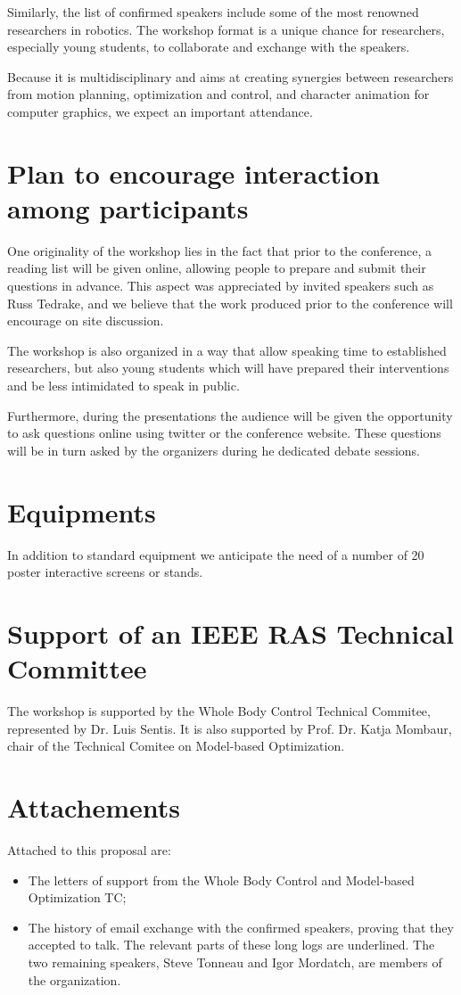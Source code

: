 \documentclass[conference]{IEEEtran}
\begin{document}
Similarly, the list of confirmed speakers include some of the most renowned researchers in robotics.
The workshop format is a unique chance for researchers, especially young students, to collaborate and exchange with the speakers.

Because it is multidisciplinary and aims at creating synergies between researchers from motion planning, optimization and control, and character animation for computer graphics, we expect an important attendance.

\section{Plan to encourage interaction among participants}
One originality of the workshop lies in the fact that prior to the conference, a reading list will be given online, allowing people to prepare and submit their questions in advance. This aspect was appreciated by invited speakers such as Russ Tedrake, and we believe that the work produced prior to the conference will encourage on site discussion.

The workshop is also organized in a way that allow speaking time to established researchers, but also young students which will have prepared their interventions and be less intimidated to speak in public.

Furthermore, during the presentations the audience will be given the opportunity to ask questions online using twitter or the conference website. These questions will be in turn asked by the organizers during he dedicated debate sessions.

\section{Equipments}
In addition to standard equipment we
anticipate the need of a number of 20 poster interactive screens
or stands.

\section{Support of an IEEE RAS Technical Committee}
The workshop is supported by the Whole Body Control Technical Commitee, represented by Dr. Luis Sentis.
It is also supported by Prof. Dr. Katja Mombaur, chair of the Technical Comitee on Model-based Optimization.

\section{Attachements}
Attached to this proposal are:
\begin{itemize}
\item The letters of support from the Whole Body Control and Model-based Optimization TC;
\item The history of email exchange with the confirmed speakers, proving that they accepted to talk.
The relevant parts of these long logs are underlined. The two remaining speakers, Steve Tonneau and Igor Mordatch,
are members of the organization.
\end{itemize}
\end{document}
